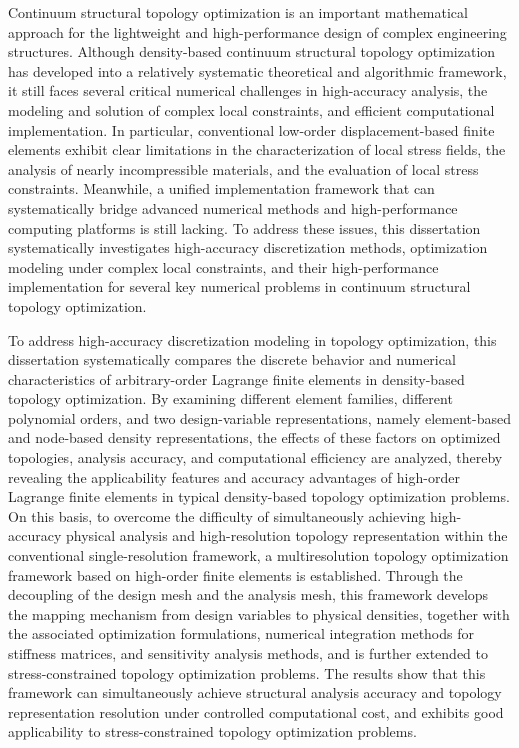 \begin{enabstract}
	
	Continuum structural topology optimization is an important mathematical approach for the lightweight and high-performance design of complex engineering structures. Although density-based continuum structural topology optimization has developed into a relatively systematic theoretical and algorithmic framework, it still faces several critical numerical challenges in high-accuracy analysis, the modeling and solution of complex local constraints, and efficient computational implementation. In particular, conventional low-order displacement-based finite elements exhibit clear limitations in the characterization of local stress fields, the analysis of nearly incompressible materials, and the evaluation of local stress constraints. Meanwhile, a unified implementation framework that can systematically bridge advanced numerical methods and high-performance computing platforms is still lacking. To address these issues, this dissertation systematically investigates high-accuracy discretization methods, optimization modeling under complex local constraints, and their high-performance implementation for several key numerical problems in continuum structural topology optimization.
	
	To address high-accuracy discretization modeling in topology optimization, this dissertation systematically compares the discrete behavior and numerical characteristics of arbitrary-order Lagrange finite elements in density-based topology optimization. By examining different element families, different polynomial orders, and two design-variable representations, namely element-based and node-based density representations, the effects of these factors on optimized topologies, analysis accuracy, and computational efficiency are analyzed, thereby revealing the applicability features and accuracy advantages of high-order Lagrange finite elements in typical density-based topology optimization problems. On this basis, to overcome the difficulty of simultaneously achieving high-accuracy physical analysis and high-resolution topology representation within the conventional single-resolution framework, a multiresolution topology optimization framework based on high-order finite elements is established. Through the decoupling of the design mesh and the analysis mesh, this framework develops the mapping mechanism from design variables to physical densities, together with the associated optimization formulations, numerical integration methods for stiffness matrices, and sensitivity analysis methods, and is further extended to stress-constrained topology optimization problems. The results show that this framework can simultaneously achieve structural analysis accuracy and topology representation resolution under controlled computational cost, and exhibits good applicability to stress-constrained topology optimization problems.
	

\end{enabstract}
